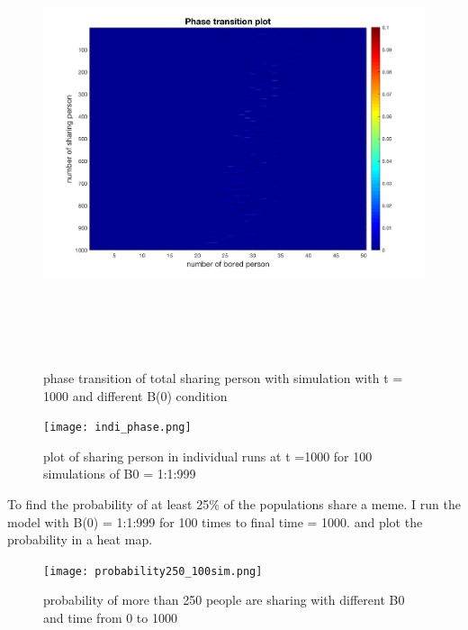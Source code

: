 \documentclass[12pt]{article}
\begin{document}
\begin{figure}[H] %
\centering
\includegraphics[width = 16 cm, height = 13cm]{phasetransition.png}
\caption{phase transition of total sharing person with simulation with t = 1000 and different B(0) condition}
\label{fig:meme_phase_transition_1}
\end{figure}

\begin{figure}[H] %
\centering
\texttt{[image: indi\_phase.png]}
\caption{plot of sharing person in individual runs at t =1000 for 100 simulations of B0 = 1:1:999}
\label{fig:meme_phase_transition_indi}
\end{figure}

To find the probability of at least 25\% of the populations share a meme. I run the model with B(0) = 1:1:999 for 100 times to final time = 1000. and plot the probability in a heat map. 

\begin{figure}[H] %
\centering
\texttt{[image: probability250\_100sim.png]}
\caption{probability of more than 250 people are sharing with different B0 and time from 0 to 1000}
\label{fig:probability250}
\end{figure}

\newpage


\end{document}

